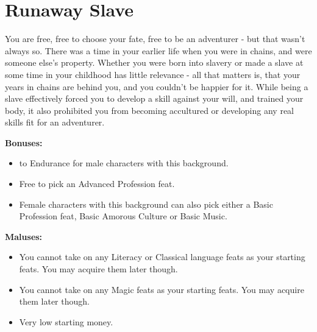 \section{Runaway Slave}
You are free, free to choose your fate, free to be an adventurer - but that wasn't always so. There was a time in your earlier life when you were in chains, and were someone else's property. Whether you were born into slavery or made a slave at some time in your childhood has little relevance - all that matters is, that your years in chains are behind you, and you couldn't be happier for it. While being a slave effectively forced you to develop a skill against your will, and trained your body, it also prohibited you from becoming accultured or developing any real skills fit for an adventurer.


\textbf{Bonuses:}
\begin{itemize}
	\item {} to Endurance for male characters with this background.
	\item Free to pick an Advanced Profession feat.
	\item Female characters with this background can also pick either a Basic Profession feat, Basic Amorous Culture or Basic Music.
\end{itemize}


\textbf{Maluses:}
\begin{itemize}
	\item You cannot take on any Literacy or Classical language feats as your starting feats. You may acquire them later though.
	\item You cannot take on any Magic feats as your starting feats. You may acquire them later though.
	\item Very low starting money.
\end{itemize}
